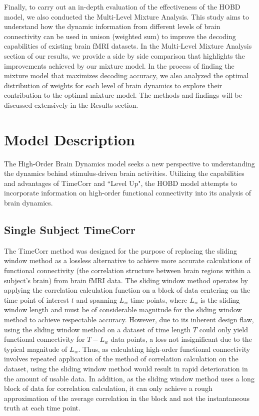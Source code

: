 \documentclass[11pt]{article}
\begin{document}
Finally, to carry out an in-depth evaluation of the effectiveness of the HOBD model, we also conducted the Multi-Level Mixture Analysis. This study aims to understand how the dynamic information from different levels of brain connectivity can be used in unison (weighted sum) to improve the decoding capabilities of existing brain fMRI datasets. In the Multi-Level Mixture Analysis section of our results, we provide a side by side comparison that highlights the improvements achieved by our mixture model. In the process of finding the mixture model that maximizes decoding accuracy, we also analyzed the optimal distribution of weights for each level of brain dynamics to explore their contribution to the optimal mixture model. The methods and findings will be discussed extensively in the Results section.

\newpage
\section{Model Description}
The High-Order Brain Dynamics model seeks a new perspective to understanding the dynamics behind stimulus-driven brain activities. Utilizing the capabilities and advantages of TimeCorr and ``Level Up", the HOBD model attempts to incorporate information on high-order functional connectivity into its analysis of brain dynamics.

\subsection{Single Subject TimeCorr}
The TimeCorr method was designed for the purpose of replacing the sliding window method as a lossless alternative to achieve more accurate calculations of functional connectivity (the correlation structure between brain regions within a subject's brain) from brain fMRI data. The sliding window method operates by applying the correlation calculation function on a block of data centering on the time point of interest $t$ and spanning $L_w$ time points, where $L_w$ is the sliding window length and must be of considerable magnitude for the sliding window method to achieve respectable accuracy. However, due to its inherent design flaw, using the sliding window method on a dataset of time length $T$ could only yield functional connectivity for $T-L_w$ data points, a loss not insignificant due to the typical magnitude of $L_w$. Thus, as calculating high-order functional connectivity involves repeated application of the method of correlation calculation on the dataset, using the sliding window method would result in rapid deterioration in the amount of usable data. In addition, as the sliding window method uses a long block of data for correlation calculation, it can only achieve a rough approximation of the average correlation in the block and not the instantaneous truth at each time point.
\end{document}
